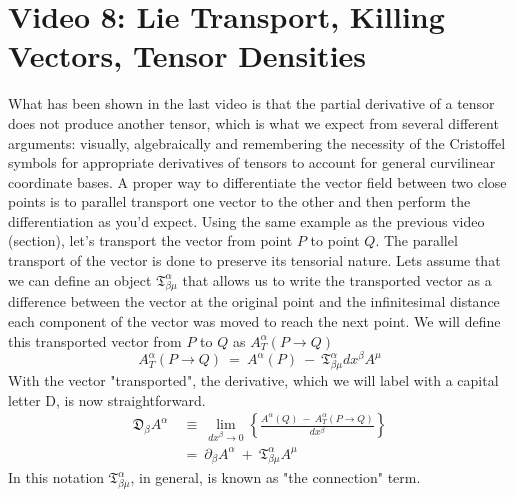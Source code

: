 \section*{Video 8: Lie Transport, Killing Vectors, Tensor Densities}

\hskip 25pt What has been shown in the last video is that the partial derivative of a tensor does not produce another
tensor, which is what we expect from several different arguments: visually, algebraically and remembering the necessity
of the Cristoffel symbols for appropriate derivatives of tensors to account for general curvilinear coordinate bases.  A
proper way to differentiate the vector field between two close points is to parallel transport one vector to the other and
then perform the differentiation as you'd expect.  Using the same example as the previous video (section), let's transport
the vector from point $P$ to point $Q$.  The parallel transport of the vector is done to preserve its tensorial nature.
Lets assume that we can define an object $\mathfrak{T}^{\alpha}_{\beta\mu}$ that allows us to write the transported vector
as a difference between the vector at the original point and the infinitesimal distance each component of the vector was moved
to reach the next point.  We will define this transported vector from $P$ to $Q$ as $A_T^{\alpha}(P\rightarrow Q)$
\begin{equation}
  A_T^{\alpha}\left(P\rightarrow Q\right)\ =\ A^{\alpha}\left(P\right)\ -\
  \mathfrak{T}^{\alpha}_{\beta\mu}dx^{\beta}A^{\mu}
\end{equation}
With the vector "transported", the derivative, which we will label with a capital letter D, is now straightforward.
\begin{equation}
  \begin{aligned}
    \mathfrak{D}_{\beta}A^{\alpha}\ &\equiv\
    \lim_{dx^{\beta}\rightarrow0}
    \left\{\frac{A^{\alpha}\left(Q\right)\ -\ A_T^{\alpha}\left(P\rightarrow Q\right)}{dx^{\beta}}\right\}\\
    &=\ \partial_{\beta}A^{\alpha}\ +\ \mathfrak{T}^{\alpha}_{\beta\mu}A^{\mu}
  \end{aligned}
\end{equation}
In this notation $\mathfrak{T}^{\alpha}_{\beta\mu}$, in general, is known as "the connection" term.
